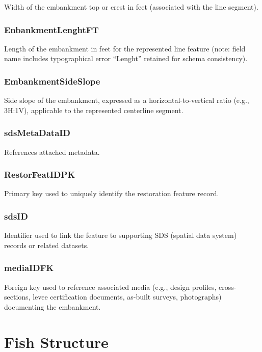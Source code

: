 \documentclass[
  letterpaper,
  DIV=11,
  numbers=noendperiod]{scrreprt}
\begin{document}
Width of the embankment top or crest in feet (associated with the line
segment).

\subsection{EnbankmentLenghtFT}\label{enbankmentlenghtft-1}

Length of the embankment in feet for the represented line feature (note:
field name includes typographical error ``Lenght'' retained for schema
consistency).

\subsection{EmbankmentSideSlope}\label{embankmentsideslope-1}

Side slope of the embankment, expressed as a horizontal-to-vertical
ratio (e.g., 3H:1V), applicable to the represented centerline segment.

\subsection{sdsMetaDataID}\label{sdsmetadataid-2}

References attached metadata.

\subsection{RestorFeatIDPK}\label{restorfeatidpk-2}

Primary key used to uniquely identify the restoration feature record.

\subsection{sdsID}\label{sdsid-2}

Identifier used to link the feature to supporting SDS (spatial data
system) records or related datasets.

\subsection{mediaIDFK}\label{mediaidfk-2}

Foreign key used to reference associated media (e.g., design profiles,
cross-sections, levee certification documents, as-built surveys,
photographs) documenting the embankment.

\chapter{Fish Structure}\label{fish-structure}
\end{document}
